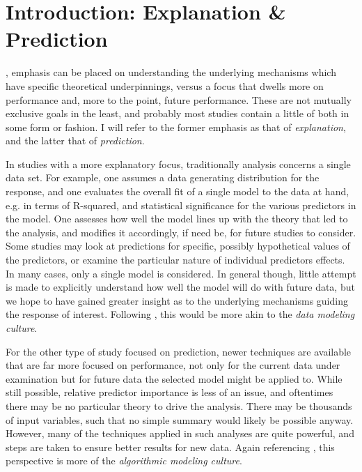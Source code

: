 \documentclass[english,nohyper,titlepage]{tufte-handout}
\begin{document}
\pagebreak{}






\part{Introduction: Explanation \& Prediction}
, emphasis can be placed on understanding the underlying mechanisms which have specific theoretical underpinnings, versus a focus that dwells more on performance and, more to the point, future performance.  These are not mutually exclusive goals in the least, and probably most studies contain a little of both in some form or fashion.  I will refer to the former emphasis as that of \emph{explanation}, and the latter that of \emph{prediction}.

In studies with a more explanatory focus, traditionally analysis concerns a single data set.  For example, one assumes a data generating distribution for the response, and one evaluates the overall fit of a single model to the data at hand, e.g. in terms of R-squared, and statistical significance for the various predictors in the model.  One assesses how well the model lines up with the theory that led to the analysis, and modifies it accordingly, if need be, for future studies to consider.  Some studies may look at  predictions for specific, possibly hypothetical values of the predictors, or examine the particular nature of individual predictors effects.  In many cases, only a single model is considered.  In general though, little attempt is made to explicitly understand how well the model will do with future data, but we hope to have gained greater insight as to the underlying mechanisms guiding the response of interest.  Following \citet{breiman_statistical_2001}, this would be more akin to the \emph{data modeling culture}.

For the other type of study focused on prediction, newer techniques are available that are far more focused on performance, not only for the current data under examination but for future data the selected model might be applied to.  While still possible, relative predictor importance is less of an issue, and oftentimes there may be no particular theory to drive the analysis.  There may be thousands of input variables, such that no simple summary would likely be possible anyway.  However, many of the techniques applied in such analyses are quite powerful, and steps are taken to ensure better results for new data.  Again referencing \citet*{breiman_statistical_2001}, this perspective is more of the \emph{algorithmic modeling culture}.
\end{document}
